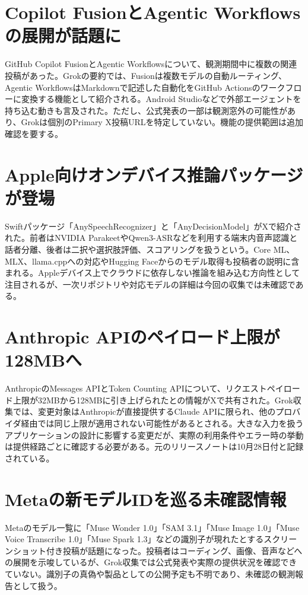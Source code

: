 \section{Copilot FusionとAgentic Workflowsの展開が話題に}
GitHub Copilot FusionとAgentic Workflowsについて、観測期間中に複数の関連投稿があった。Grokの要約では、Fusionは複数モデルの自動ルーティング、Agentic WorkflowsはMarkdownで記述した自動化をGitHub Actionsのワークフローに変換する機能として紹介される。Android Studioなどで外部エージェントを持ち込む動きも言及された。ただし、公式発表の一部は観測窓外の可能性があり、Grokは個別のPrimary X投稿URLを特定していない。機能の提供範囲は追加確認を要する。

\section{Apple向けオンデバイス推論パッケージが登場}
Swiftパッケージ「AnySpeechRecognizer」と「AnyDecisionModel」がXで紹介された。前者はNVIDIA ParakeetやQwen3-ASRなどを利用する端末内音声認識と話者分離、後者は二択や選択肢評価、スコアリングを扱うという。Core ML、MLX、llama.cppへの対応やHugging Faceからのモデル取得も投稿者の説明に含まれる。Appleデバイス上でクラウドに依存しない推論を組み込む方向性として注目されるが、一次リポジトリや対応モデルの詳細は今回の収集では未確認である。

\section{Anthropic APIのペイロード上限が128MBへ}
AnthropicのMessages APIとToken Counting APIについて、リクエストペイロード上限が32MBから128MBに引き上げられたとの情報がXで共有された。Grok収集では、変更対象はAnthropicが直接提供するClaude APIに限られ、他のプロバイダ経由では同じ上限が適用されない可能性があるとされる。大きな入力を扱うアプリケーションの設計に影響する変更だが、実際の利用条件やエラー時の挙動は提供経路ごとに確認する必要がある。元のリリースノートは10月28日付と記録されている。

\section{Metaの新モデルIDを巡る未確認情報}
Metaのモデル一覧に「Muse Wonder 1.0」「SAM 3.1」「Muse Image 1.0」「Muse Voice Transcribe 1.0」「Muse Spark 1.3」などの識別子が現れたとするスクリーンショット付き投稿が話題になった。投稿者はコーディング、画像、音声などへの展開を示唆しているが、Grok収集では公式発表や実際の提供状況を確認できていない。識別子の真偽や製品としての公開予定も不明であり、未確認の観測報告として扱う。

